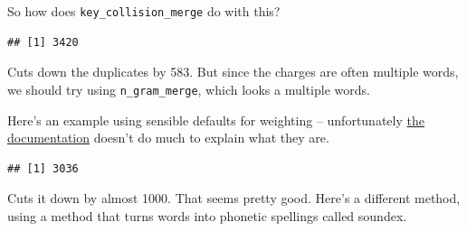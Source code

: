\documentclass[]{book}
\newenvironment{Shaded}{\begin{snugshade}}{\end{snugshade}}
\newcommand{\DataTypeTok}[1]{\textcolor[rgb]{0.13,0.29,0.53}{#1}}
\newcommand{\DecValTok}[1]{\textcolor[rgb]{0.00,0.00,0.81}{#1}}
\newcommand{\FloatTok}[1]{\textcolor[rgb]{0.00,0.00,0.81}{#1}}
\newcommand{\KeywordTok}[1]{\textcolor[rgb]{0.13,0.29,0.53}{\textbf{#1}}}
\newcommand{\NormalTok}[1]{#1}
\newcommand{\OperatorTok}[1]{\textcolor[rgb]{0.81,0.36,0.00}{\textbf{#1}}}
\newcommand{\StringTok}[1]{\textcolor[rgb]{0.31,0.60,0.02}{#1}}
\begin{document}
So how does \texttt{key\_collision\_merge} do with this?

\begin{Shaded}
\end{Shaded}

\begin{verbatim}
## [1] 3420
\end{verbatim}

Cuts down the duplicates by 583. But since the charges are often multiple words, we should try using \texttt{n\_gram\_merge}, which looks a multiple words.

Here's an example using sensible defaults for weighting -- unfortunately \href{https://github.com/ChrisMuir/refinr}{the documentation} doesn't do much to explain what they are.

\begin{Shaded}
\end{Shaded}

\begin{verbatim}
## [1] 3036
\end{verbatim}

Cuts it down by almost 1000. That seems pretty good. Here's a different method, using a method that turns words into phonetic spellings called soundex.
\end{document}
